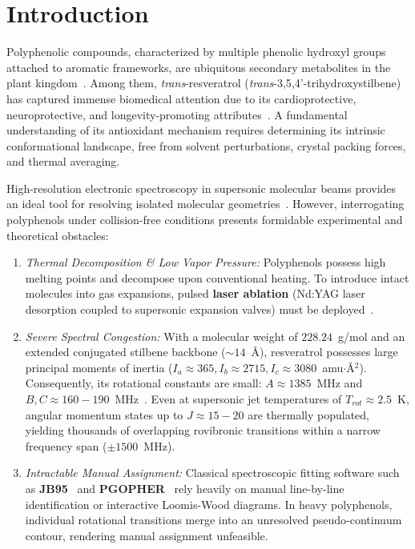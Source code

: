 \documentclass[aps,jcp,reprint,twocolumn,superscriptaddress,showpacs,amsmath,amssymb]{revtex4-2}
\begin{document}
\maketitle

\section{Introduction}
Polyphenolic compounds, characterized by multiple phenolic hydroxyl groups attached to aromatic frameworks, are ubiquitous secondary metabolites in the plant kingdom~\cite{zwier2006laser,gerhards2003structure}. Among them, \textit{trans}-resveratrol (\textit{trans}-3,5,4'-trihydroxystilbene) has captured immense biomedical attention due to its cardioprotective, neuroprotective, and longevity-promoting attributes~\cite{smeyers2004resveratrol}. A fundamental understanding of its antioxidant mechanism requires determining its intrinsic conformational landscape, free from solvent perturbations, crystal packing forces, and thermal averaging.

High-resolution electronic spectroscopy in supersonic molecular beams provides an ideal tool for resolving isolated molecular geometries~\cite{alvarez2006rotationally,tan2019high}. However, interrogating polyphenols under collision-free conditions presents formidable experimental and theoretical obstacles:
\begin{enumerate}
    \item \textit{Thermal Decomposition \& Low Vapor Pressure:} Polyphenols possess high melting points and decompose upon conventional heating. To introduce intact molecules into gas expansions, pulsed \textbf{laser ablation} (Nd:YAG laser desorption coupled to supersonic expansion valves) must be deployed~\cite{tan2019high}.
    \item \textit{Severe Spectral Congestion:} With a molecular weight of $228.24$~g/mol and an extended conjugated stilbene backbone ($\sim 14$~\AA), resveratrol possesses large principal moments of inertia ($I_a \approx 365, I_b \approx 2715, I_c \approx 3080$~amu$\cdot$\AA$^2$). Consequently, its rotational constants are small: $A \approx 1385$~MHz and $B, C \approx 160 - 190$~MHz~\cite{smeyers2004resveratrol}. Even at supersonic jet temperatures of $T_{rot} \approx 2.5$~K, angular momentum states up to $J \approx 15 - 20$ are thermally populated, yielding thousands of overlapping rovibronic transitions within a narrow frequency span ($\pm 1500$~MHz).
    \item \textit{Intractable Manual Assignment:} Classical spectroscopic fitting software such as \textbf{JB95}~\cite{alvarez2006rotationally} and \textbf{PGOPHER}~\cite{western2014pgopher} rely heavily on manual line-by-line identification or interactive Loomis-Wood diagrams. In heavy polyphenols, individual rotational transitions merge into an unresolved pseudo-continuum contour, rendering manual assignment unfeasible.
\end{enumerate}
\end{document}
